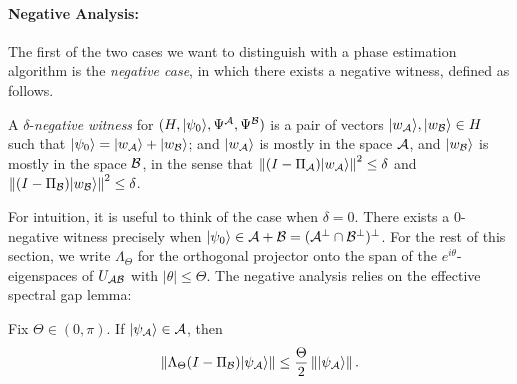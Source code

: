 \documentclass{article}
\def\ket#1{{\lvert}#1\rangle}
\renewcommand{\>}{\rangle}
\newcommand{\<}{\langle}
\renewcommand{\(}{\left(}
\renewcommand{\)}{\right)}
\def\norm#1{\left\| #1 \right\|}
\begin{document}
\paragraph{Negative Analysis:}
The first of the two cases we want to distinguish with a phase estimation algorithm is the \emph{negative case}, in which there exists a negative witness, defined as follows.

\begin{definition}\label{def:neg-witness}
A $\delta$-\emph{negative witness} for $(H,\ket{\psi_0},\Psi^{\cal A},\Psi^{\cal B})$ is a pair of vectors $\ket{w_{\cal A}},\ket{w_{\cal B}}\in H$ such that $\ket{\psi_0}=\ket{w_{\cal A}}+\ket{w_{\cal B}}$; and $\ket{w_{\cal A}}$ is mostly in the space $\cal A$, and $\ket{w_{\cal B}}$ is mostly in the space $\cal B$, in the sense that $\norm{(I-\Pi_{\cal A})\ket{w_{\cal A}}}^2\leq \delta$ and $\norm{(I-\Pi_{\cal B})\ket{w_{\cal B}}}^2\leq \delta$. 
\end{definition}


For intuition, it is useful to think of the case when $\delta=0$. There exists a 0-negative witness precisely when $\ket{\psi_0}\in {\cal A}+{\cal B} = ({\cal A}^\bot\cap {\cal B}^\bot)^\bot$. For the rest of this section, we write  $\Lambda_\Theta$ for the orthogonal projector onto the span of the $e^{i\theta}$-eigenspaces of $U_{\cal AB}$ with $|\theta|\leq \Theta$. The negative analysis relies on the effective spectral gap lemma:
\begin{lemma}\label{lem:effective-spectral-gap}
Fix $\Theta\in (0,\pi)$. If $\ket{\psi_{\cal A}}\in {\cal A}$, then 
$$\norm{\Lambda_\Theta(I-\Pi_{\cal B})\ket{\psi_{\cal A}}} \leq \frac{\Theta}{2}\norm{\ket{\psi_{\cal A}}}.$$
\end{lemma}
\end{document}

